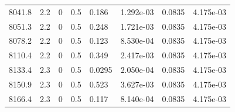 \documentclass[preview]{standalone}
\begin{document}
{{{{{{{{\begin{tabular}{L{1.2cm}C{1.2cm} C{0.3cm}C{0.5cm} C{1.4cm}C{1.4cm} C{1.4cm}C{1.4cm}}
  8041.8  &   2.2  & 0     & 0.5 &  0.186  & 1.292e-03  & 0.0835 &  4.175e-03   \\ 
  8051.3  &   2.2  & 0     & 0.5 &  0.248  & 1.721e-03  & 0.0835 &  4.175e-03   \\ 
  8078.2  &   2.2  & 0     & 0.5 &  0.123  & 8.530e-04  & 0.0835 &  4.175e-03   \\ 
  8110.4  &   2.2  & 0     & 0.5 &  0.349  & 2.417e-03  & 0.0835 &  4.175e-03   \\ 
  8133.4  &   2.3  & 0     & 0.5 &  0.0295  & 2.050e-04  & 0.0835 &  4.175e-03   \\ 
  8150.9  &   2.3  & 0     & 0.5 &  0.523  & 3.627e-03  & 0.0835 &  4.175e-03   \\ 
  8166.4  &   2.3  & 0     & 0.5 &  0.117  & 8.140e-04  & 0.0835 &  4.175e-03   \\ 
\hline 
\end{tabular} 

}}}}}}}}
\end{document}
